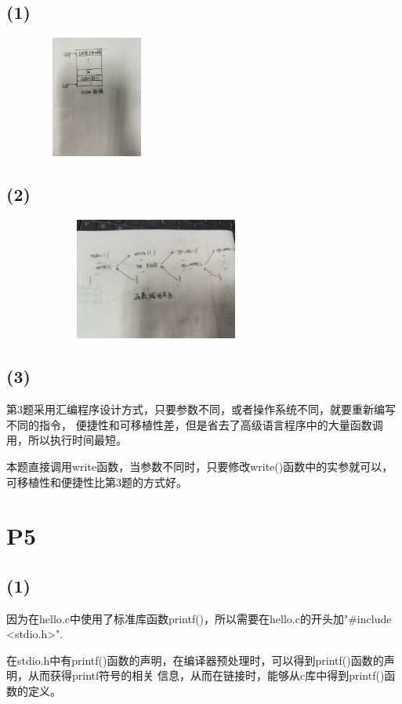 \documentclass{article}
\begin{document}
\subsection*{(1)}
\begin{figure}[htbp]
	\centering
	\includegraphics[width=4cm,height=4cm]{2.jpg}
\end{figure}

\subsection*{(2)}
\begin{figure}[h]
	\centering
	\includegraphics[width=8cm,height=4cm]{3.jpg}
\end{figure}
\newpage
\subsection*{(3)}
第3题采用汇编程序设计方式，只要参数不同，或者操作系统不同，就要重新编写不同的指令，
便捷性和可移植性差，但是省去了高级语言程序中的大量函数调用，所以执行时间最短。

本题直接调用write函数，当参数不同时，只要修改write()函数中的实参就可以，可移植性和便捷性比第3题的方式好。
\section*{P5}
\subsection*{(1)}
因为在hello.c中使用了标准库函数printf()，所以需要在hello.c的开头加"\#include <stdio.h>".

在stdio.h中有printf()函数的声明，在编译器预处理时，可以得到printf()函数的声明，从而获得printf符号的相关
信息，从而在链接时，能够从c库中得到printf()函数的定义。
\end{document}

